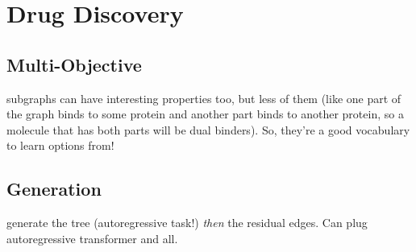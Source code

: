 \section{Drug Discovery}

\subsection{Multi-Objective}
\citet{jin2020multi} subgraphs can have interesting properties too, but less of them (like one part of the graph binds to some protein and another part binds to another protein, so a molecule that has both parts will be dual binders). So, they’re a good vocabulary to learn options from!

\subsection{Generation}
\citet{ahn2021spanning} generate the tree (autoregressive task!) \textit{then} the residual edges. Can plug autoregressive transformer and all.
